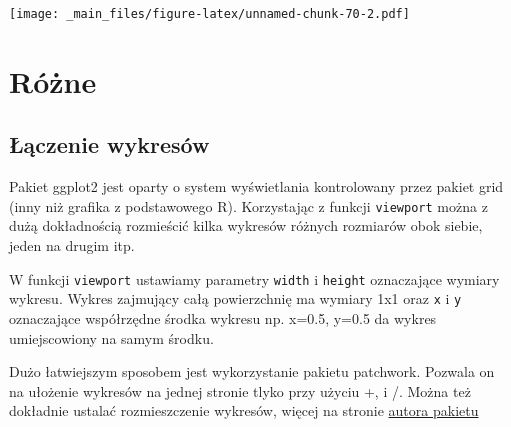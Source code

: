 \documentclass[
]{book}
\begin{document}
\texttt{[image: \_main\_files/figure-latex/unnamed-chunk-70-2.pdf]}

\hypertarget{ruxf3ux17cne}{%
\section{Różne}\label{ruxf3ux17cne}}

\hypertarget{ux142ux105czenie-wykresuxf3w}{%
\subsection{Łączenie wykresów}\label{ux142ux105czenie-wykresuxf3w}}

Pakiet ggplot2 jest oparty o system wyświetlania kontrolowany przez pakiet grid (inny niż grafika z podstawowego R). Korzystając z funkcji \texttt{viewport} można z dużą dokładnością rozmieścić kilka wykresów różnych rozmiarów obok siebie, jeden na drugim itp.

W funkcji \texttt{viewport} ustawiamy parametry \texttt{width} i \texttt{height} oznaczające wymiary wykresu. Wykres zajmujący całą powierzchnię ma wymiary 1x1 oraz \texttt{x} i \texttt{y} oznaczające współrzędne środka wykresu np. x=0.5, y=0.5 da wykres umiejscowiony na samym środku.

Dużo łatwiejszym sposobem jest wykorzystanie pakietu patchwork. Pozwala on na ułożenie wykresów na jednej stronie tlyko przy użyciu +, \textbar{} i /. Można też dokładnie ustalać rozmieszczenie wykresów, więcej na stronie \href{https://patchwork.data-imaginist.com/index.html}{autora pakietu}
\end{document}
